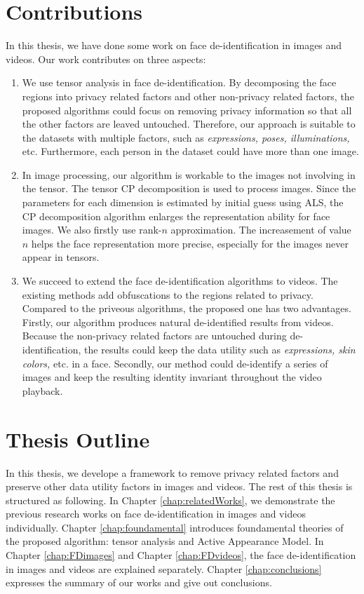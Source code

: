 \section{Contributions}
\label{sec:contri}
In this thesis, we have done some work on face de-identification in images
and videos. Our work contributes on three aspects:
\begin{enumerate}
	\item We use tensor analysis in face de-identification. By decomposing
		the face regions into privacy related factors and other non-privacy related 
		factors, the proposed algorithms could focus on removing privacy 
		information so that all the other factors are leaved untouched. Therefore, our approach
		is suitable to the datasets with multiple factors, such as {\it 
		expressions, poses, illuminations,} etc. Furthermore, each person in
		the dataset could have more than one image.
	\item In image processing, our algorithm is workable to the images not 
		involving in the tensor. The tensor CP decomposition is used to process images. 
		Since the parameters for each dimension is estimated by initial guess using ALS,
		the CP decomposition algorithm enlarges the representation ability for face
		images. We also firstly use	rank-$n$ approximation.
		The increasement of value $n$ helps the face representation more precise, especially
		for the images never appear in tensors. 
	\item We succeed to extend the face de-identification algorithms to videos. The existing
		methods add obfuscations to the regions related to privacy. Compared to the
		priveous algorithms, the proposed one has two advantages. 
		Firstly, our algorithm produces natural de-identified results from videos. 
		Because the non-privacy related factors are untouched during de-identification, 
		the results could keep the data utility such as {\it expressions, skin colors,} etc. 
		in a face. Secondly, our method could de-identify a series of images and keep 
		the resulting identity invariant throughout the video playback.
\end{enumerate}

\section{Thesis Outline}
\label{sec:outline}
In this thesis, we develope a framework to remove privacy related factors and 
preserve other data utility factors in images and videos. 
The rest of this thesis is structured as following.
In Chapter \ref{chap:relatedWorks}, we demonstrate the previous research works
on face de-identification in images and videos individually. Chapter \ref{chap:foundamental}
introduces foundamental theories of the proposed algorithm: tensor
analysis and Active Appearance Model. In Chapter \ref{chap:FDimages} and 
Chapter \ref{chap:FDvideos}, the face de-identification in images and videos are 
explained separately. Chapter \ref{chap:conclusions} expresses the summary of our
works and give out conclusions.

